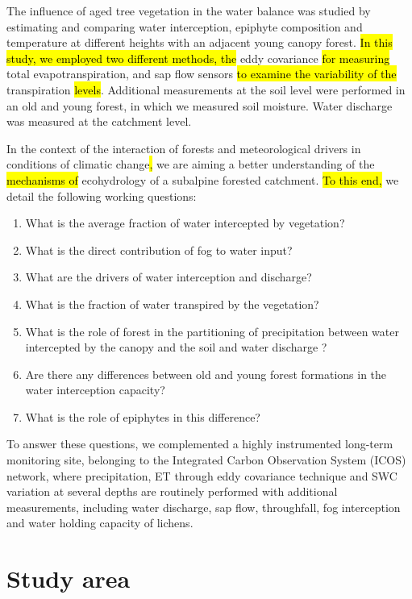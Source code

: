 \documentclass[10pt,letterpaper]{article}
\begin{document}
The influence of aged tree vegetation in the water balance was studied by estimating and comparing water interception, epiphyte composition and temperature at different heights with an adjacent young canopy forest. \hl{In this study, we employed two different methods, the} eddy covariance \hl{for measuring }total evapotranspiration, and sap flow sensors \hl{to examine the variability of the} transpiration \hl{levels}. Additional measurements at the soil level were performed in an old and young forest, in which we measured soil moisture. Water discharge was measured at the catchment level. 

In the context of the interaction of forests and meteorological drivers in conditions of climatic change\hl{, }we are aiming a better understanding of the \hl{mechanisms of }ecohydrology of a subalpine forested catchment. \hl{To this end,} we detail the following working questions:

\begin{enumerate}
    \item What is the average fraction of water intercepted by vegetation?
    \item What is the direct contribution of fog to water input?
    \item What are the drivers of water interception and discharge?
    \item What is the fraction of water transpired by the vegetation?
    \item What is the role of forest in the partitioning of precipitation between water intercepted by the canopy and the soil and water discharge ?
    \item Are there any differences between old and young forest formations in the water interception capacity? 
    \item What is the role of epiphytes in this difference?
 \end{enumerate}
 
To answer these questions, we complemented a highly instrumented long-term monitoring site, belonging to the Integrated Carbon Observation System (ICOS) network, where precipitation, ET through eddy covariance technique and SWC variation at several depths are routinely performed with additional measurements, including water discharge, sap flow, throughfall, fog interception and water holding capacity of lichens.

\section{Study area}
\end{document}
